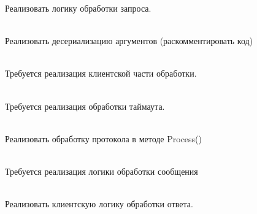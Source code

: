 \begin{DoxyRefList}
\label{todo__todo000012}%
%
Реализовать логику обработки запроса.  
\item[Member \doxylink{class_g_n_e_t_1_1_cash_serial_a03f2b9373bf375c22ece6bc72da361ac}{GNET\+::Cash\+Serial\+::Delivery} (Manager\+::\+Session\+::\+ID proxy\+\_\+sid, const Octets\+Stream \&os\+Arg)]\hfill \\
\label{todo__todo000013}%
%
Реализовать десериализацию аргументов (раскомментировать код)  
\item[Member \doxylink{class_g_n_e_t_1_1_coupon_exchange_a2724fc3e9de704a29e7c3404e8e5851d}{GNET\+::Coupon\+Exchange\+::Client} (Rpc\+::\+Data \texorpdfstring{$\ast$}{*}argument, Rpc\+::\+Data \texorpdfstring{$\ast$}{*}result, Manager \texorpdfstring{$\ast$}{*}manager, Manager\+::\+Session\+::\+ID sid)]\hfill \\
\label{todo__todo000014}%
%
Требуется реализация клиентской части обработки.  
\item[Member \doxylink{class_g_n_e_t_1_1_coupon_exchange_a6cb455f6c3cb08734cc8238c540161c4}{GNET\+::Coupon\+Exchange\+::On\+Timeout} ()]\hfill \\
\label{todo__todo000015}%
%
Требуется реализация обработки таймаута.  
\item[Class \doxylink{class_g_n_e_t_1_1_discount_announce}{GNET\+::Discount\+Announce} ]\hfill \\
\label{todo__todo000016}%
%
Реализовать обработку протокола в методе Process()  
\item[Member \doxylink{class_g_n_e_t_1_1_game2_a_u_a778ef1862d9abe838530c75c45882fb7}{GNET\+::Game2\+AU\+::Process} (Manager \texorpdfstring{$\ast$}{*}manager, Manager\+::\+Session\+::\+ID sid)]\hfill \\
\label{todo__todo000017}%
%
Требуется реализация логики обработки сообщения  
\item[Member \doxylink{class_g_n_e_t_1_1_get_user_coupon_a6425acba2965486d055a994213699122}{GNET\+::Get\+User\+Coupon\+::Client} (Rpc\+::\+Data \texorpdfstring{$\ast$}{*}argument, Rpc\+::\+Data \texorpdfstring{$\ast$}{*}result, Manager \texorpdfstring{$\ast$}{*}manager, Manager\+::\+Session\+::\+ID sid)]\hfill \\
\label{todo__todo000020}%
%
Реализовать клиентскую логику обработки ответа.  
\item[Member \doxylink{class_g_n_e_t_1_1_get_user_coupon_aaf7a0b7d88805c3071a892a7eb45e7d6}{GNET\+::Get\+User\+Coupon\+::On\+Timeout} ()]\hfill \\

\end{DoxyRefList}
